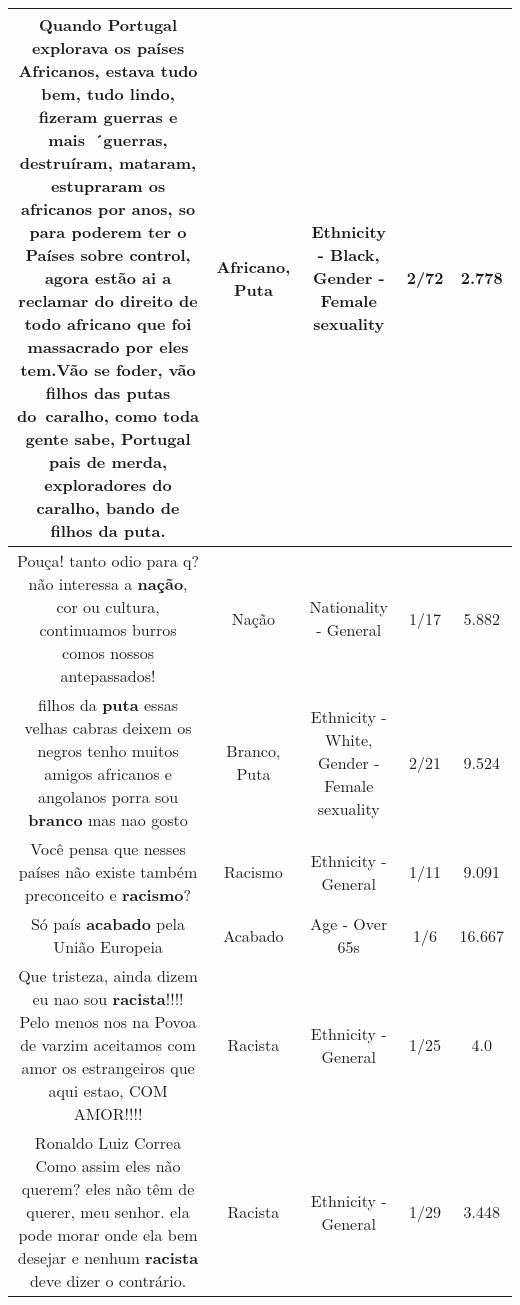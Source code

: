 \documentclass[11pt]{article}
\newlength\mylength
\begin{document}
\begin{center}
\begin{longtable}{|C{.65\mylength}|C{.30\mylength}|C{.12\mylength}|C{.12\mylength}|C{.12\mylength}|}
  \small Quando Portugal explorava os países Africanos, estava tudo bem, tudo lindo, fizeram guerras e mais ´guerras, destruíram, mataram, estupraram os africanos por anos, so para poderem ter o Países sobre control, agora estão ai a reclamar do direito de todo \textbf{africano} que foi massacrado por eles tem.Vão se foder, vão filhos das putas do caralho, como toda gente sabe, Portugal pais de merda, exploradores do caralho, bando de filhos da \textbf{puta}.\normalsize   & Africano, Puta & Ethnicity - Black, Gender - Female sexuality & 2/72 & 2.778 \\  \hline
  \small Pouça! tanto odio para q? não interessa a \textbf{nação}, cor ou cultura, continuamos burros comos nossos antepassados!\normalsize   & Nação & Nationality - General & 1/17 & 5.882 \\  \hline
  \small filhos da \textbf{puta} essas velhas cabras deixem os negros tenho muitos amigos africanos  e angolanos porra sou \textbf{branco} mas nao gosto\normalsize   & Branco, Puta & Ethnicity - White, Gender - Female sexuality & 2/21 & 9.524 \\  \hline
  \small Você pensa que nesses países não existe também preconceito e \textbf{racismo}?\normalsize   & Racismo & Ethnicity - General & 1/11 & 9.091 \\  \hline
  \small Só país \textbf{acabado} pela União Europeia\normalsize   & Acabado & Age - Over 65s & 1/6 & 16.667 \\  \hline
  \small Que tristeza, ainda dizem eu nao sou \textbf{racista}!!!! Pelo menos nos na Povoa de varzim aceitamos com amor os estrangeiros que aqui estao, COM AMOR!!!!\normalsize   & Racista & Ethnicity - General & 1/25 & 4.0 \\  \hline
  \small Ronaldo Luiz Correa  Como assim eles não querem? eles não têm de querer, meu senhor. ela pode morar onde ela bem desejar e nenhum \textbf{racista} deve dizer o contrário.\normalsize   & Racista & Ethnicity - General & 1/29 & 3.448 \\  \hline

\end{longtable}
\end{center}
\end{document}
